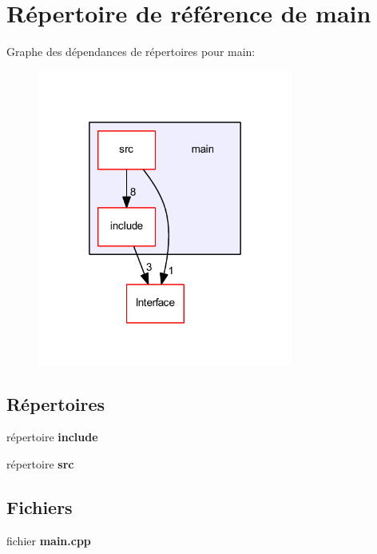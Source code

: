 \section{Répertoire de référence de main}
\label{dir_5c982d53a68cdbcd421152b4020263a9}
Graphe des dépendances de répertoires pour main\+:\nopagebreak
\begin{figure}[H]
\begin{center}
\leavevmode
\includegraphics[width=238pt]{dir_5c982d53a68cdbcd421152b4020263a9_dep}
\end{center}
\end{figure}
\subsection*{Répertoires}
\begin{DoxyCompactItemize}
\item 
répertoire {\bf include}
\item 
répertoire {\bf src}
\end{DoxyCompactItemize}
\subsection*{Fichiers}
\begin{DoxyCompactItemize}
\item 
fichier {\bf main.\+cpp}
\end{DoxyCompactItemize}
